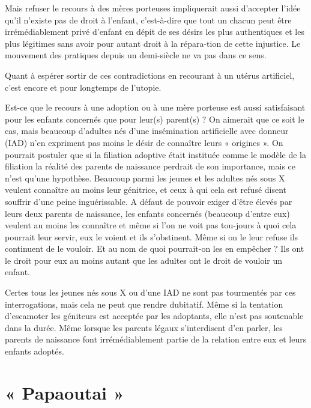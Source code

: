   Mais refuser le recours à des mères porteuses impliquerait aussi d'accepter l'idée qu'il n'existe pas de droit à l'enfant, c'est-à-dire que tout un chacun peut être irrémédiablement privé d'enfant en dépit de ses désirs les plus authentiques et les plus légitimes sans avoir pour autant droit à la répara-tion de cette injustice. Le mouvement des pratiques depuis un demi-siècle ne va pas dans ce sens.

Quant à espérer sortir de ces contradictions en recourant à un utérus artificiel, c'est encore et pour longtemps de l'utopie.

Est-ce que le recours à une adoption ou à une mère porteuse est aussi satisfaisant pour les enfants concernés que pour leur(s) parent(s) ? On aimerait que ce soit le cas, mais beaucoup d'adultes nés d'une insémination artificielle avec donneur (IAD) n’en expriment pas moins le désir de connaître leurs « origines ». On pourrait postuler que si la filiation adoptive était instituée comme le modèle de la filiation la réalité des parents de naissance perdrait de son importance, mais ce n'est qu'une hypothèse. Beaucoup parmi les jeunes et les adultes nés sous X veulent connaître au moins leur génitrice, et ceux à qui cela est refusé disent souffrir d'une peine inguérissable. A défaut de pouvoir exiger d'être élevés par leurs deux parents de naissance, les enfants concernés (beaucoup d'entre eux) veulent au moins les connaître et même si l'on ne voit pas tou-jours à quoi cela pourrait leur servir, eux le voient et ils s'obstinent. Même si on le leur refuse ils continuent de le vouloir. Et au nom de quoi pourrait-on les en empêcher ? Ils ont le droit pour eux au moins autant que les adultes ont le droit de vouloir un enfant.
 
 Certes tous les jeunes nés sous X ou d'une IAD ne sont pas tourmentés par ces interrogations, mais cela ne peut que rendre dubitatif. Même si la tentation d'escamoter les géniteurs est acceptée par les adoptants, elle n'est pas soutenable dans la durée.  Même lorsque les parents légaux s'interdisent d'en parler, les parents de naissance font irrémédiablement partie de la relation entre eux et leurs enfants adoptés. 

\section{« Papaoutai »} 


